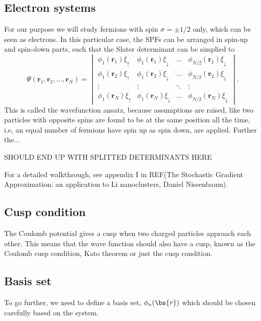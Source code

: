 \subsection{Electron systems} \label{subsubsec:electronsystem}
For our purpose we will study fermions with spin $\sigma=\pm 1/2$ only, which can be seen as electrons. In this particular case, the SPFs can be arranged in spin-up and spin-down parts, such that the Slater determinant can be simplied to 
\begin{equation}
\Psi(\boldsymbol{r}_1,\boldsymbol{r}_2,\hdots,\boldsymbol{r}_N)=
\begin{vmatrix}
\phi_1(\boldsymbol{r}_1)\xi_{\uparrow} & \phi_1(\boldsymbol{r}_1)\xi_{\downarrow} & \hdots & \phi_{N/2}(\boldsymbol{r}_1)\xi_{\downarrow}\\
\phi_1(\boldsymbol{r}_2)\xi_{\uparrow} & \phi_1(\boldsymbol{r}_2)\xi_{\downarrow} & \hdots & \phi_{N/2}(\boldsymbol{r}_2)\xi_{\downarrow}\\
\vdots & \vdots & \ddots & \vdots \\
\phi_1(\boldsymbol{r}_N)\xi_{\uparrow} & \phi_1(\boldsymbol{r}_N)\xi_{\downarrow} & \hdots & \phi_{N/2}(\boldsymbol{r}_N)\xi_{\downarrow}
\end{vmatrix}.
\end{equation}
This is called the wavefunction ansatz, because assumptions are raised, like two particles with opposite spins are found to be at the same position all the time, i.e, an equal number of fermions have spin up as spin down, are applied. Further the...

SHOULD END UP WITH SPLITTED DETERMINANTS HERE

For a detailed walkthrough, see appendix I in REF(The Stochastic Gradient Approximation: an application to Li nanoclusters, Daniel Nissenbaum). 

\subsection{Cusp condition} \label{subsubsec:cusp}
The Coulomb potential gives a cusp when two charged particles approach each other. This means that the wave function should also have a cusp, known as the Coulomb cusp condition, Kato theorem or just the cusp condition. 

\subsection{Basis set} \label{subsubsec:basisset}
To go further, we need to define a basis set, $\phi_n(\bs{r})$ which should be chosen carefully based on the system. 

